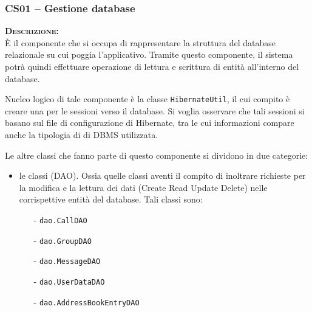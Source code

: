 \subsubsection{CS01 -- Gestione database}
\begin{description}
\item{\scshape\bfseries Descrizione:}\\
È il componente che si occupa di rappresentare la struttura del database relazionale su cui poggia l'applicativo. Tramite questo componente, il sistema potrà quindi effettuare operazione di lettura e scrittura di entità all'interno del database.

Nucleo logico di tale componente è la classe \texttt{HibernateUtil}, il cui compito è creare una  per le sessioni verso il database. Si voglia osservare che tali sessioni si basano sul file di configurazione di Hibernate, tra le cui informazioni compare anche la tipologia di di DBMS utilizzata.

Le altre classi che fanno parte  di questo componente si dividono in due categorie:
\begin{itemize}
	\item le classi  (DAO). Ossia quelle classi aventi il compito di inoltrare richieste per la modifica e la lettura dei dati (Create Read Update Delete) nelle corrispettive entità del database. Tali classi sono:
	\begin{itemize}
		\item[-] \texttt{dao.CallDAO}
		\item[-] \texttt{dao.GroupDAO}
		\item[-] \texttt{dao.MessageDAO}
		\item[-] \texttt{dao.UserDataDAO}
		\item[-] \texttt{dao.AddressBookEntryDAO}
	\end{itemize}
	

\end{itemize}
\end{description}
